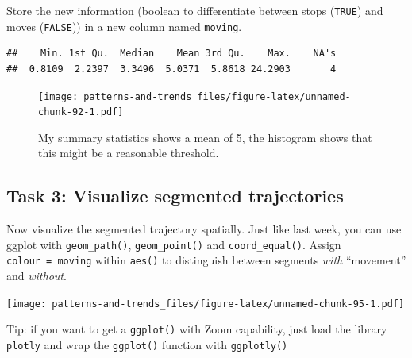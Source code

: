 \documentclass[]{book}
\begin{document}
Store the new information (boolean to differentiate between stops (\texttt{TRUE}) and moves (\texttt{FALSE})) in a new column named \texttt{moving}.

\begin{verbatim}
##    Min. 1st Qu.  Median    Mean 3rd Qu.    Max.    NA's 
##  0.8109  2.2397  3.3496  5.0371  5.8618 24.2903       4
\end{verbatim}

\begin{figure}
\centering
\texttt{[image: patterns-and-trends\_files/figure-latex/unnamed-chunk-92-1.pdf]}
\caption{\label{fig:unnamed-chunk-92}My summary statistics shows a mean of 5, the histogram shows that this might be a reasonable threshold.}
\end{figure}

\hypertarget{task-3-visualize-segmented-trajectories}{%
\subsection{Task 3: Visualize segmented trajectories}\label{task-3-visualize-segmented-trajectories}}

Now visualize the segmented trajectory spatially. Just like last week, you can use ggplot with \texttt{geom\_path()}, \texttt{geom\_point()} and \texttt{coord\_equal()}. Assign \texttt{colour\ =\ moving} within \texttt{aes()} to distinguish between segments \emph{with} ``movement'' and \emph{without}.

\texttt{[image: patterns-and-trends\_files/figure-latex/unnamed-chunk-95-1.pdf]}

Tip: if you want to get a \texttt{ggplot()} with Zoom capability, just load the library \texttt{plotly} and wrap the \texttt{ggplot()} function with \texttt{ggplotly()}
\end{document}
